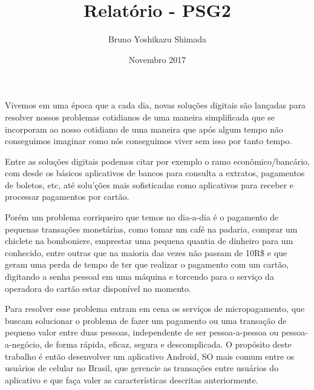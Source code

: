 \documentclass[12pt]{article}
\title{Relat\'orio - PSG2}
\author{Bruno Yoshikazu Shimada}
\date{Novembro 2017}
\begin{document}
\maketitle

\newpage
\section*{}

Vivemos em uma \'epoca que a cada dia, novas solu\c{c}\~oes digitais s\~ao lan\c{c}adas para resolver nossos problemas cotidianos de uma maneira simplificada que se incorporam ao nosso cotidiano de uma maneira que ap\'os algum tempo n\~ao conseguimos imaginar como n\'os conseguimos viver sem isso por tanto tempo.

Entre as solu\c{c}\~oes digitais podemos citar por exemplo o ramo econ\^omico/banc\'ario, com desde os b\'asicos aplicativos de bancos para consulta a extratos, pagamentos de boletos, etc, at\'e solu'\c{c}\~oes mais sofisticadas como aplicativos para receber e processar pagamentos por cart\~ao.

Por\'em um problema corriqueiro que temos no dia-a-dia \'e o pagamento de pequenas transa\c{c}\~oes monet\'arias, como tomar um caf\'e na padaria, comprar um chiclete na bomboniere, emprestar uma pequena quantia de dinheiro para um conhecido, entre outras que na maioria das vezes n\~ao passam de 10R\$ e que geram uma perda de tempo de ter que realizar o pagamento com um cart\~ao, digitando a senha pessoal em uma m\'aquina e torcendo para o servi\c{c}o da operadora do cart\~ao estar disponível no momento.

Para resolver esse problema entram em cena os servi\c{c}os de micropagamento, que buscam solucionar o problema de fazer um pagamento ou uma transa\c{c}\~ao de pequeno valor entre duas pessoas, independente de ser pessoa-a-pessoa ou pessoa-a-neg\'ocio, de forma r\'apida, eficaz, segura e descomplicada. O prop\'osito deste trabalho \'e ent\~ao desenvolver um aplicativo Android, SO mais comum entre os usu\'arios de celular no Brasil, que gerencie as transações entre usu\'arios do aplicativo e que fa\c{c}a valer as caracter\'isticas descritas anteriormente.
\newline
\end{document}
